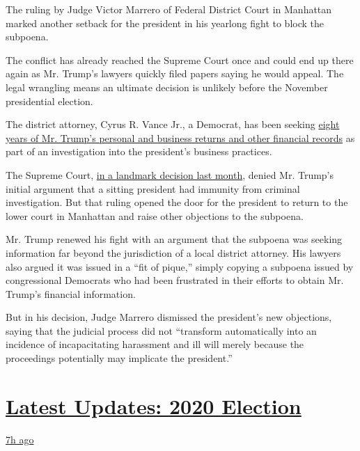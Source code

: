 The ruling by Judge Victor Marrero of Federal District Court in
Manhattan marked another setback for the president in his yearlong fight
to block the subpoena.

The conflict has already reached the Supreme Court once and could end up
there again as Mr. Trump's lawyers quickly filed papers saying he would
appeal. The legal wrangling means an ultimate decision is unlikely
before the November presidential election.

The district attorney, Cyrus R. Vance Jr., a Democrat, has been seeking
\href{https://www.nytimes3xbfgragh.onion/2019/09/16/nyregion/trump-tax-returns-cy-vance.html}{eight
years of Mr. Trump's personal and business returns and other financial
records} as part of an investigation into the president's business
practices.

The Supreme Court,
\href{https://www.nytimes3xbfgragh.onion/2020/07/09/us/trump-taxes-supreme-court.html?searchResultPosition=3}{in
a landmark decision last month}, denied Mr. Trump's initial argument
that a sitting president had immunity from criminal investigation. But
that ruling opened the door for the president to return to the lower
court in Manhattan and raise other objections to the subpoena.

Mr. Trump renewed his fight with an argument that the subpoena was
seeking information far beyond the jurisdiction of a local district
attorney. His lawyers also argued it was issued in a ``fit of pique,''
simply copying a subpoena issued by congressional Democrats who had been
frustrated in their efforts to obtain Mr. Trump's financial information.

But in his decision, Judge Marrero dismissed the president's new
objections, saying that the judicial process did not ``transform
automatically into an incidence of incapacitating harassment and ill
will merely because the proceedings potentially may implicate the
president.''

\hypertarget{latest-updates-2020-election}{%
\section{\texorpdfstring{\href{https://www.nytimes3xbfgragh.onion/live/2020/08/19/us/dnc-convention-election?action=click\&pgtype=Article\&state=default\&region=MAIN_CONTENT_1\&context=storylines_live_updates}{Latest
Updates: 2020
Election}}{Latest Updates: 2020 Election}}\label{latest-updates-2020-election}}

\href{https://www.nytimes3xbfgragh.onion/live/2020/08/19/us/dnc-convention-election?action=click\&pgtype=Article\&state=default\&region=MAIN_CONTENT_1\&context=storylines_live_updates\#night-3-featured-more-policy-a-focus-on-women-and-a-full-throated-rejection-of-trump-by-his-predecessor}{7h
ago}

